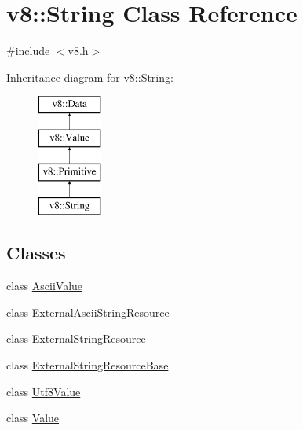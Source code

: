 \hypertarget{classv8_1_1_string}{}\section{v8\+:\+:String Class Reference}
\label{classv8_1_1_string}


{\ttfamily \#include $<$v8.\+h$>$}

Inheritance diagram for v8\+:\+:String\+:\begin{figure}[H]
\begin{center}
\leavevmode
\includegraphics[height=4.000000cm]{classv8_1_1_string}
\end{center}
\end{figure}
\subsection*{Classes}
\begin{DoxyCompactItemize}
\item 
class \hyperlink{classv8_1_1_string_1_1_ascii_value}{Ascii\+Value}
\item 
class \hyperlink{classv8_1_1_string_1_1_external_ascii_string_resource}{External\+Ascii\+String\+Resource}
\item 
class \hyperlink{classv8_1_1_string_1_1_external_string_resource}{External\+String\+Resource}
\item 
class \hyperlink{classv8_1_1_string_1_1_external_string_resource_base}{External\+String\+Resource\+Base}
\item 
class \hyperlink{classv8_1_1_string_1_1_utf8_value}{Utf8\+Value}
\item 
class \hyperlink{classv8_1_1_string_1_1_value}{Value}
\end{DoxyCompactItemize}
